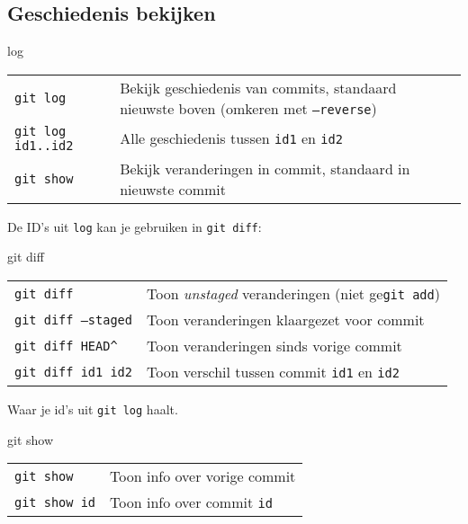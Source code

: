 \subsection{Geschiedenis bekijken}
\begin{frame}{log}
	\begin{tabularx}{\linewidth}{lX}
		\texttt{git log}
			& Bekijk geschiedenis van commits, standaard nieuwste boven (omkeren met \texttt{--reverse})\\
		\texttt{git log id1..id2}
			& Alle geschiedenis tussen \texttt{id1} en \texttt{id2}\\
		\texttt{git show}
			& Bekijk veranderingen in commit, standaard in nieuwste commit
	\end{tabularx}

	\medskip
	De ID's uit \texttt{log} kan je gebruiken in \texttt{git diff}:
\end{frame}

\begin{frame}{git diff}
	\begin{tabularx}{\linewidth}{lX}
		\texttt{git diff}
			& Toon \textit{unstaged} veranderingen (niet ge\texttt{git add})\\
		\texttt{git diff --staged}
			& Toon veranderingen klaargezet voor commit\\
		\texttt{git diff HEAD\^}
			& Toon veranderingen sinds vorige commit\\
		\texttt{git diff id1 id2}
			& Toon verschil tussen commit \texttt{id1} en \texttt{id2}
	\end{tabularx}

	\medskip
	{\footnotesize Waar je id's uit \texttt{git log} haalt. }
\end{frame}

\begin{frame}{git show}
	\begin{tabular}{l l}
		\texttt{git show}
			& Toon info over vorige commit\\
		\texttt{git show id}
			& Toon info over commit \texttt{id}\\
	\end{tabular}
\end{frame}

